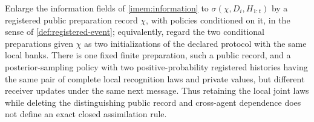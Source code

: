 Enlarge the information fields of \cref{imem:information} to $\sigma(\chi,D_i,H_{1:t})$ by a registered public preparation record $\chi$, with policies conditioned on it, in the sense of \cref{def:registered-event}; equivalently, regard the two conditional preparations given $\chi$ as two initializations of the declared protocol with the same local banks. There is one fixed finite preparation, such a public record, and a posterior-sampling policy with two positive-probability registered histories having the same pair of complete local recognition laws and private values, but different receiver updates under the same next message. Thus retaining the local joint laws while deleting the distinguishing public record and cross-agent dependence does not define an exact closed assimilation rule.
